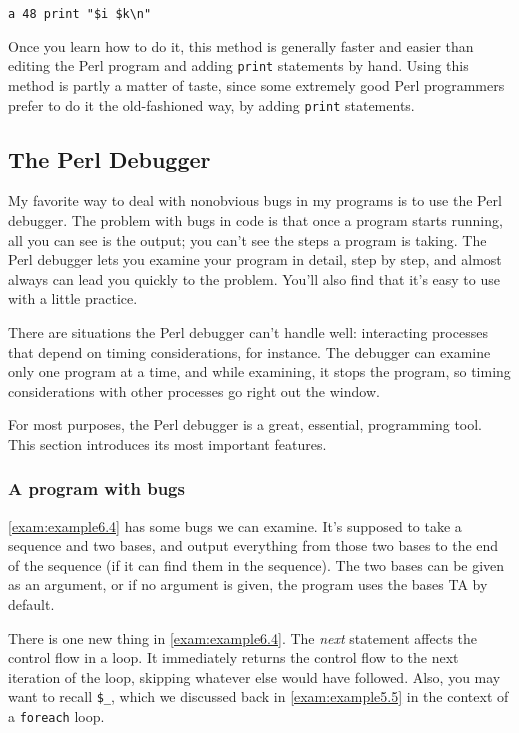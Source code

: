 \begin{lstlisting}
a 48 print "$i $k\n"
\end{lstlisting}

Once you learn how to do it, this method is generally faster and easier than editing the Perl program and adding \verb|print| statements by hand. Using this method is partly a matter of taste, since some extremely good Perl programmers prefer to do it the old-fashioned way, by adding \verb|print| statements. 

\subsection{The Perl Debugger}
My favorite way to deal with nonobvious bugs in my programs is to use the Perl debugger. The problem with bugs in code is that once a program starts running, all you can see is the output; you can't see the steps a program is taking. The Perl debugger lets you examine your program in detail, step by step, and almost always can lead you quickly to the problem. You'll also find that it's easy to use with a little practice.

There are situations the Perl debugger can't handle well: interacting processes that depend on timing considerations, for instance. The debugger can examine only one program at a time, and while examining, it stops the program, so timing considerations with other processes go right out the window.

For most purposes, the Perl debugger is a great, essential, programming tool. This section introduces its most important features. 

\subsubsection{A program with bugs}
\autoref{exam:example6.4} has some bugs we can examine. It's supposed to take a sequence and two bases, and output everything from those two bases to the end of the sequence (if it can find them in the sequence). The two bases can be given as an argument, or if no argument is given, the program uses the bases TA by default.

There is one new thing in \autoref{exam:example6.4}. The \textit{next} statement affects the control flow in a loop. It immediately returns the control flow to the next iteration of the loop, skipping whatever else would have followed. Also, you may want to recall \verb|$_|, which we discussed back in \autoref{exam:example5.5} in the context of a \verb|foreach| loop. 

